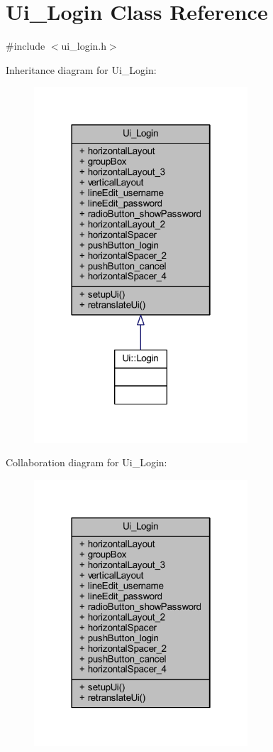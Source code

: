 \hypertarget{class_ui___login}{}\section{Ui\+\_\+\+Login Class Reference}
\label{class_ui___login}


{\ttfamily \#include $<$ui\+\_\+login.\+h$>$}



Inheritance diagram for Ui\+\_\+\+Login\+:\nopagebreak
\begin{figure}[H]
\begin{center}
\leavevmode
\includegraphics[width=226pt]{class_ui___login__inherit__graph}
\end{center}
\end{figure}


Collaboration diagram for Ui\+\_\+\+Login\+:\nopagebreak
\begin{figure}[H]
\begin{center}
\leavevmode
\includegraphics[width=226pt]{class_ui___login__coll__graph}
\end{center}
\end{figure}
